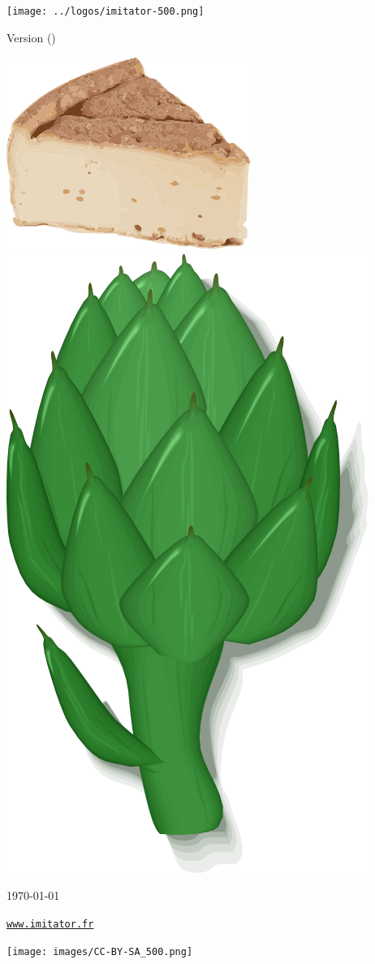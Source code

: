 
\thispagestyle{empty}

\mbox{}

\vspace{1cm}

\begin{center}
	{\Huge \bfseries \titleOnFirstPage{}}

	\vspace{2cm}

	\texttt{[image: ../logos/imitator-500.png]}

	\vspace{2.5cm}
	
	{\Large Version \imitatorversion{} (\imitatorversionname{})}
	
	\medskip
	
	\includegraphics[height=0.15\textwidth]{../logos/logo-3-300.png}
	\hspace{2em}
	\includegraphics[height=0.15\textwidth]{../logos/logo-3-1-300.png}

\end{center}

\vspace{1.5cm}

{\small \hfill{}\today{}}

\vspace{2cm}

\begin{center}
 	{\Large \href{https://www.imitator.fr/}{\nolinkurl{www.imitator.fr}}}
 	
\end{center}
\hfill\texttt{[image: images/CC-BY-SA\_500.png]}




\newpage

\tableofcontents
{}

\newpage
